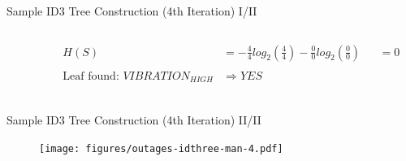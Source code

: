 \documentclass[document.tex]{subfiles}
\begin{document}
    \begin{frame}{Sample ID3 Tree Construction (4th Iteration) I/II}
        \begin{columns}
            \begin{column}{0.4\textwidth}
                \begin{table}
                    \caption*{\footnotesize Sample $S$ \normalsize}
                    \vspace*{-2mm}
                \end{table}
            \end{column}
            \begin{column}{0.6\textwidth}
                \begin{alignat*}{3}
                    H(S) &= -\frac{4}{4}log_2(\frac{4}{4}) - \frac{0}{0}log_2(\frac{0}{0}) &&= 0 \\\\
                    \text{Leaf found: } VIBRATION_{HIGH} &\Rightarrow YES \\
                \end{alignat*}
            \end{column}
        \end{columns}
    \end{frame}
    
    \begin{frame}{Sample ID3 Tree Construction (4th Iteration) II/II}
        \begin{figure}
            \texttt{[image: figures/outages-idthree-man-4.pdf]}
        \end{figure}
    \end{frame}
\end{document}
